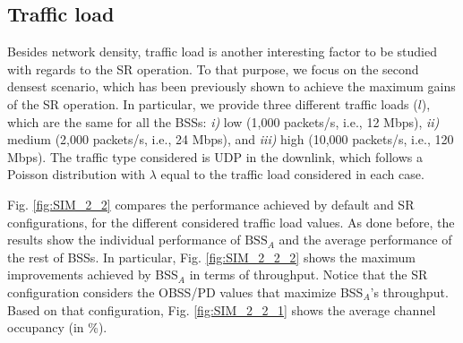 \documentclass{ieeeaccess}
\begin{document}
\subsection{Traffic load}
\label{section:random_scenarios_traffic_load}
Besides network density, traffic load is another interesting factor to be studied with regards to the SR operation. To that purpose, we focus on the second densest scenario, which has been previously shown to achieve the maximum gains of the SR operation. In particular, we provide three different traffic loads ($l$), which are the same for all the BSSs: \emph{i)} low (1,000 packets/s, i.e., 12 Mbps), \emph{ii)} medium (2,000 packets/s, i.e., 24 Mbps), and \emph{iii)} high (10,000 packets/s, i.e., 120 Mbps). The traffic type considered is UDP in the downlink, which follows a Poisson distribution with $\lambda$ equal to the traffic load considered in each case.

Fig. \ref{fig:SIM_2_2} compares the performance achieved by default and SR configurations, for the different considered traffic load values. As done before, the results show the individual performance of $\text{BSS}_A$ and the average performance of the rest of BSSs. In particular, Fig. \ref{fig:SIM_2_2_2} shows the maximum improvements achieved by BSS$_A$ in terms of throughput. Notice that the SR configuration considers the OBSS/PD values that maximize BSS$_A$'s throughput. Based on that configuration, Fig. \ref{fig:SIM_2_2_1} shows the average channel occupancy (in \%).
\end{document}
